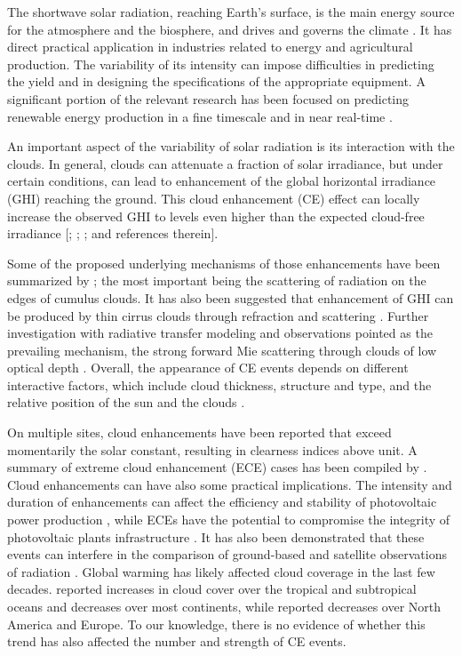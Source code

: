 \documentclass[preprint, 5p,
authoryear]{elsarticle} %
\begin{document}
The shortwave solar radiation, reaching Earth's surface, is the main
energy source for the atmosphere and the biosphere, and drives and
governs the climate \citep{Gray2010}. It has direct practical
application in industries related to energy and agricultural production.
The variability of its intensity can impose difficulties in predicting
the yield and in designing the specifications of the appropriate
equipment. A significant portion of the relevant research has been
focused on predicting renewable energy production in a fine timescale
and in near real-time \citep[for a review
see][]{Inman2013, Graabak2016}.

An important aspect of the variability of solar radiation is its
interaction with the clouds. In general, clouds can attenuate a fraction
of solar irradiance, but under certain conditions, can lead to
enhancement of the global horizontal irradiance (GHI) reaching the
ground. This cloud enhancement (CE) effect can locally increase the
observed GHI to levels even higher than the expected cloud-free
irradiance {[}\citet{Cordero2023}; \citet{Vamvakas2020};
\citet{CastillejoCuberos2020}; and references therein{]}.

Some of the proposed underlying mechanisms of those enhancements have
been summarized by \citet{Gueymard2017}; the most important being the
scattering of radiation on the edges of cumulus clouds. It has also been
suggested that enhancement of GHI can be produced by thin cirrus clouds
through refraction and scattering \citep{Thuillier2013}. Further
investigation with radiative transfer modeling and observations pointed
as the prevailing mechanism, the strong forward Mie scattering through
clouds of low optical depth
\citep{Pecenak2016, Thuillier2013, Yordanov2013, Yordanov2015}. Overall,
the appearance of CE events depends on different interactive factors,
which include cloud thickness, structure and type, and the relative
position of the sun and the clouds \citep{Gueymard2017, Veerman2022}.

On multiple sites, cloud enhancements have been reported that exceed
momentarily the solar constant, resulting in clearness indices above
unit. A summary of extreme cloud enhancement (ECE) cases has been
compiled by \citet{Martins2022}. Cloud enhancements can have also some
practical implications. The intensity and duration of enhancements can
affect the efficiency and stability of photovoltaic power production
\citep{Lappalainen2020, Jaervelae2020}, while ECEs have the potential to
compromise the integrity of photovoltaic plants infrastructure
\citep{DoNascimento2019}. It has also been demonstrated that these
events can interfere in the comparison of ground-based and satellite
observations of radiation \citep{Damiani2018}. Global warming has likely
affected cloud coverage in the last few decades. \citet{Liu2023}
reported increases in cloud cover over the tropical and subtropical
oceans and decreases over most continents, while \citet{Dong2023}
reported decreases over North America and Europe. To our knowledge,
there is no evidence of whether this trend has also affected the number
and strength of CE events.
\end{document}
